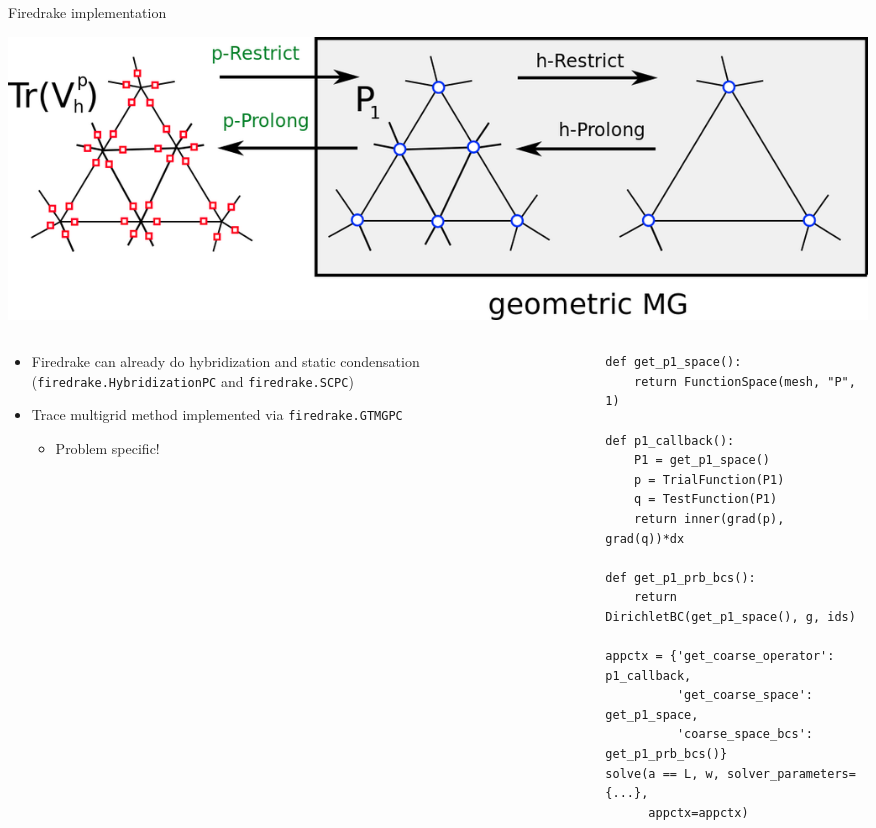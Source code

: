 \documentclass[9pt]{beamer}
\begin{document}
\begin{frame}[fragile]{Firedrake implementation}
	\begin{center}
		\includegraphics[width=\linewidth]{figures/multigrid_gtmg}
	\end{center}
\begin{columns}
	\begin{column}{0.5\textwidth}
		\begin{itemize}
			\item Firedrake can already do hybridization and static condensation (\texttt{firedrake.HybridizationPC} and \texttt{firedrake.SCPC})
			\item Trace multigrid method implemented via \texttt{firedrake.GTMGPC}
			\begin{itemize}
				\item Problem specific!
			\end{itemize}
		\end{itemize}
	\end{column}
	\begin{column}{0.5\textwidth}
		\begin{verbatim}
def get_p1_space():
    return FunctionSpace(mesh, "P", 1)
	
def p1_callback():
    P1 = get_p1_space()
    p = TrialFunction(P1)
    q = TestFunction(P1)
    return inner(grad(p), grad(q))*dx
	
def get_p1_prb_bcs():
    return DirichletBC(get_p1_space(), g, ids)

appctx = {'get_coarse_operator': p1_callback,
          'get_coarse_space': get_p1_space,
          'coarse_space_bcs': get_p1_prb_bcs()}
solve(a == L, w, solver_parameters={...},
      appctx=appctx)
		\end{verbatim}
	\end{column}
\end{columns}
\end{frame}
\end{document}
